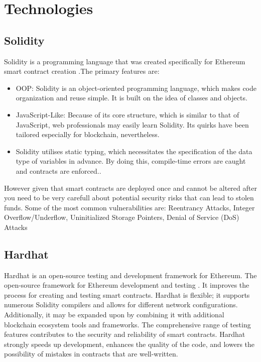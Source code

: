 \chapter{Technologies}

\section{Solidity}
\label{sec:ch3sec1}
Solidity is a programming language that was created specifically for Ethereum smart contract creation \cite{sdocs} .The primary features are:

\begin{itemize}
	\item OOP: Solidity is an object-oriented programming language, which makes code organization and reuse simple. It is built on the idea of classes and objects.
	\item JavaScript-Like: Because of its core structure, which is similar to that of JavaScript, web professionals may easily learn Solidity. Its quirks have been tailored especially for blockchain, nevertheless.
	\item Solidity utilises static typing, which necessitates the specification of the data type of variables in advance. By doing this, compile-time errors are caught and contracts are enforced..
\end{itemize}

However given that smart contracts are deployed once and cannot be altered after you need to be very carefull about potential security risks that can lead to stolen funds. Some of the most common vulnerabilities are: Reentrancy Attacks, Integer Overflow/Underflow, Uninitialized Storage Pointers, Denial of Service (DoS) Attacks \cite{solidityVulnerabilities}

\section{Hardhat}
\label{sec:ch3sec2}
Hardhat is an open-source testing and development framework for Ethereum. The open-source framework for Ethereum development and testing \cite{hardhat}. It improves the process for creating and testing smart contracts. Hardhat is flexible; it supports numerous Solidity compilers and allows for different network configurations. Additionally, it may be expanded upon by combining it with additional blockchain ecosystem tools and frameworks. The comprehensive range of testing features contributes to the security and reliability of smart contracts. Hardhat strongly speeds up development, enhances the quality of the code, and lowers the possibility of mistakes in contracts that are well-written.

